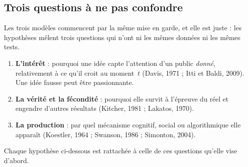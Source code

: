 \documentclass[a4paper,11pt]{article}
\begin{document}
\subsection*{Trois questions à ne pas confondre}
Les trois modèles commencent par la même mise en garde, et elle est juste : les hypothèses mêlent trois questions qui n'ont ni les mêmes données ni les mêmes tests.
\begin{enumerate}[itemsep=1pt]
\item \textbf{L'intérêt} : pourquoi une idée capte l'attention d'un public \emph{donné}, relativement à ce qu'il croit au moment~$t$ (Davis, 1971 ; Itti et Baldi, 2009). Une idée fausse peut être passionnante.
\item \textbf{La vérité et la fécondité} : pourquoi elle survit à l'épreuve du réel et engendre d'autres résultats (Kitcher, 1981 ; Lakatos, 1970).
\item \textbf{La production} : par quel mécanisme cognitif, social ou algorithmique elle apparaît (Koestler, 1964 ; Swanson, 1986 ; Simonton, 2004).
\end{enumerate}
Chaque hypothèse ci-dessous est rattachée à celle de ces questions qu'elle vise d'abord.
\end{document}

